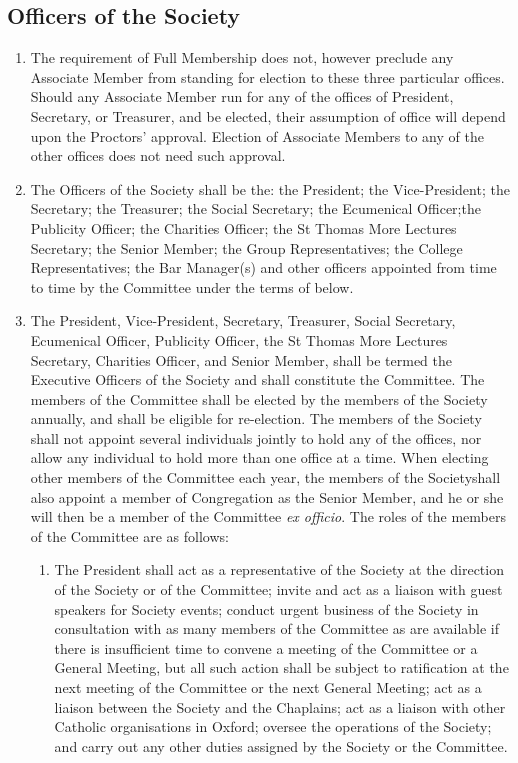 \documentclass[11pt]{article}
\begin{document}
\subsection{Officers of the Society}
\begin{enumerate}
\item The requirement of Full Membership does not, however preclude any Associate Member from standing for election to these three particular offices. Should any Associate Member run for any of the offices of President, Secretary, or Treasurer, and be elected, their assumption of office will depend upon the Proctors' approval. Election of Associate Members to any of the other offices does not need such approval.
\item The Officers of the Society shall be the: the President; the Vice-President; the Secretary; the Treasurer; the Social Secretary; the Ecumenical Officer;the Publicity Officer; the Charities Officer; the St Thomas More Lectures Secretary; the Senior Member; the Group Representatives; the College Representatives; the Bar Manager(s) and other officers appointed from time to time by the Committee under the terms of  below.
\item The President, Vice-President, Secretary, Treasurer, Social Secretary, Ecumenical Officer, Publicity Officer, the St Thomas More Lectures Secretary, Charities Officer, and Senior Member, shall be termed the Executive Officers of the Society and shall constitute the Committee. The members of the Committee shall be elected by the members of the Society annually, and shall be eligible for re-election. The members of the Society shall not appoint several individuals jointly to hold any of the offices, nor allow any individual to hold more than one office at a time. When electing other members of the Committee each year, the members of the Societyshall also appoint a member of Congregation as the Senior Member, and he or she will then be a member of the Committee \emph{ex officio}.  The roles of the members of the Committee are as follows:
\begin{enumerate}
\item The President shall act as a representative of the Society at the direction of the Society or of the Committee; invite and act as a liaison with guest speakers for Society events; conduct urgent business of the Society in consultation with as many members of the Committee as are available if there is insufficient time to convene a meeting of the Committee or a General Meeting, but all such action shall be subject to ratification at the next meeting of the Committee or the next General Meeting; act as a liaison between the Society and the Chaplains; act as a liaison with other Catholic organisations in Oxford; oversee the operations of the Society; and carry out any other duties assigned by the Society or the Committee.

\end{enumerate}
\end{enumerate}
\end{document}
